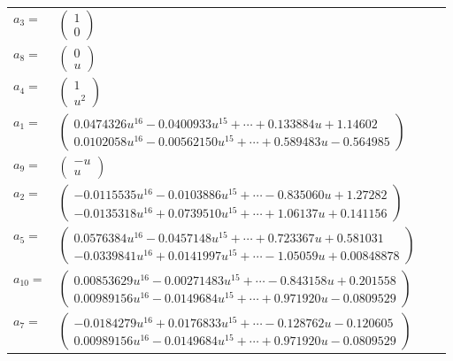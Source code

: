 \documentclass[1p]{elsarticle_modified}
\theoremstyle{definition}
\begin{document}
\begin{tabular}{m{7pt} m{180pt} m{7pt} m{180pt} }
\flushright $a_{3}=$&$\begin{pmatrix}1\\0\end{pmatrix}$ \\
\flushright $a_{8}=$&$\begin{pmatrix}0\\u\end{pmatrix}$ \\
\flushright $a_{4}=$&$\begin{pmatrix}1\\u^2\end{pmatrix}$ \\
\flushright $a_{1}=$&$\begin{pmatrix}0.0474326 u^{16}-0.0400933 u^{15}+\cdots+0.133884 u+1.14602\\0.0102058 u^{16}-0.00562150 u^{15}+\cdots+0.589483 u-0.564985\end{pmatrix}$ \\
\flushright $a_{9}=$&$\begin{pmatrix}- u\\u\end{pmatrix}$ \\
\flushright $a_{2}=$&$\begin{pmatrix}-0.0115535 u^{16}-0.0103886 u^{15}+\cdots-0.835060 u+1.27282\\-0.0135318 u^{16}+0.0739510 u^{15}+\cdots+1.06137 u+0.141156\end{pmatrix}$ \\
\flushright $a_{5}=$&$\begin{pmatrix}0.0576384 u^{16}-0.0457148 u^{15}+\cdots+0.723367 u+0.581031\\-0.0339841 u^{16}+0.0141997 u^{15}+\cdots-1.05059 u+0.00848878\end{pmatrix}$ \\
\flushright $a_{10}=$&$\begin{pmatrix}0.00853629 u^{16}-0.00271483 u^{15}+\cdots-0.843158 u+0.201558\\0.00989156 u^{16}-0.0149684 u^{15}+\cdots+0.971920 u-0.0809529\end{pmatrix}$ \\
\flushright $a_{7}=$&$\begin{pmatrix}-0.0184279 u^{16}+0.0176833 u^{15}+\cdots-0.128762 u-0.120605\\0.00989156 u^{16}-0.0149684 u^{15}+\cdots+0.971920 u-0.0809529\end{pmatrix}$ \\

\end{tabular}
\end{document}
